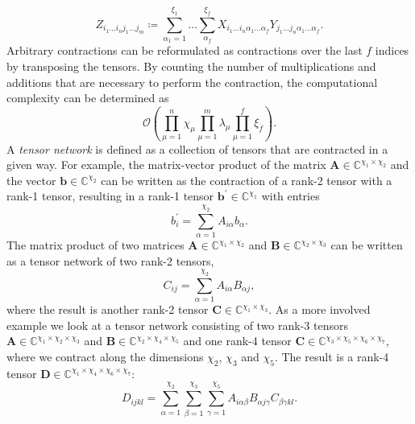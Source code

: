 \begin{equation}
	Z_{i_1\dots i_nj_1\dots j_m} \coloneqq \sum_{\alpha_1 = 1}^{\xi_1} \dots \sum_{\alpha_f}^{\xi_f} X_{i_1\dots i_n\alpha_1\dots\alpha_f} Y_{j_1\dots j_n\alpha_1\dots\alpha_f}.
\end{equation}
Arbitrary contractions can be reformulated as contractions over the last $f$ indices by transposing the tensors. By counting the number of multiplications and additions that are necessary to perform the contraction, the computational complexity can be determined as
\begin{equation}
	\label{eq:tensor_contraction_general_computational_complexity}
	\mathcal{O}\left(\prod_{\mu=1}^{n}\chi_\mu \prod_{\mu=1}^{m}\lambda_\mu \prod_{\mu=1}^{f}\xi_f\right).
\end{equation}
A \textit{tensor network} is defined as a collection of tensors that are contracted in a given way. For example, the matrix-vector product of the matrix $\bm{A} \in \mathbb{C}^{\chi_1\times\chi_2}$ and the vector $\bm{b} \in \mathbb{C}^{\chi_2}$ can be written as the contraction of a rank-2 tensor with a rank-1 tensor, resulting in a rank-1 tensor $\bm{b}^\prime \in \mathbb{C}^{\chi_1}$ with entries
\begin{equation}
	\label{eq:example_tensor_network_matrix_vector_product}
	b_i^\prime = \sum_{\alpha=1}^{\chi_2} A_{i\alpha} b_\alpha.
\end{equation}
The matrix product of two matrices $\bm{A} \in \mathbb{C}^{\chi_1\times\chi_2}$ and $\bm{B} \in \mathbb{C}^{\chi_2\times\chi_3}$ can be written as a tensor network of two rank-2 tensors,
\begin{equation}
	\label{eq:example_tensor_network_matrix_product}
	C_{ij} = \sum_{\alpha=1}^{\chi_2} A_{i\alpha} B_{\alpha j},
\end{equation}
where the result is another rank-2 tensor $\bm{C}\in\mathbb{C}^{\chi_1\times\chi_3}$.
As a more involved example we look at a tensor network consisting of two rank-3 tensors $\bm{A}\in\mathbb{C}^{\chi_1\times\chi_2\times\chi_3}$ and $\bm{B}\in\mathbb{C}^{\chi_2\times\chi_4\times\chi_5}$ and one rank-4 tensor $\bm{C}\in\mathbb{C}^{\chi_3\times\chi_5\times\chi_6\times\chi_7}$, where we contract along the dimensions $\chi_2$, $\chi_3$ and $\chi_5$. The result is a rank-4 tensor $\bm{D}\in\mathbb{C}^{\chi_1\times\chi_4\times\chi_6\times\chi_7}$:
\begin{equation}
	\label{eq:example_tensor_network_involved_network}
	D_{ijkl} = \sum_{\alpha=1}^{\chi_2} \sum_{\beta=1}^{\chi_3} \sum_{\gamma=1}^{\chi_5} A_{i \alpha \beta} B_{\alpha j\gamma} C_{\beta \gamma k l}.
\end{equation}
